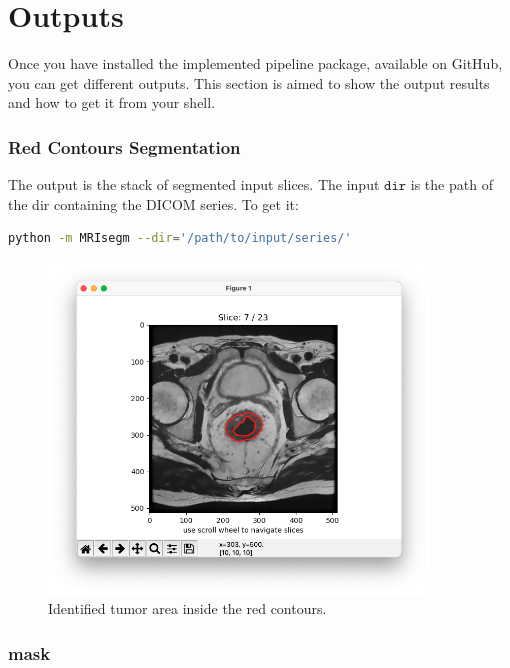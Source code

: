 \documentclass{standalone}
\begin{document}
\section{Outputs}
Once you have installed the implemented pipeline package, available on GitHub\cite{img-segm}, you can get different outputs.
This section is aimed to show the output results and how to get it from your shell.

\subsubsection{Red Contours Segmentation}

The output is the stack of segmented input slices.
The input $\mathtt{dir}$ is the path of the dir containing the DICOM series.
To get it:
\begin{lstlisting}[language = bash]
python -m MRIsegm --dir='/path/to/input/series/'  
\end{lstlisting}

\begin{figure}[ht]

    \centering
    \includegraphics[width=0.9\textwidth]{../images/example_redcont.png}

    \caption{Identified tumor area inside the red contours.}
    \label{quickstart}
    
\end{figure}

\clearpage
\newpage

\subsubsection{mask}
\end{document}
